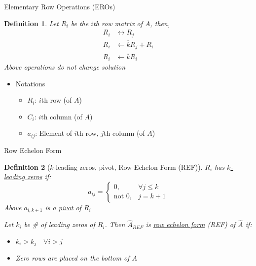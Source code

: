 \documentclass[a4paper,11pt]{article}
\newtheorem{defn}{Definition}
\begin{document}
\begin{frame}[t]{Elementary Row Operations (EROs)}
	\begin{defn}
		Let $R_i$ be the $i$th row matrix of $A$, then, 
		\begin{align*}
			R_i &\leftrightarrow R_j \tag{$ERO_1(i,j)$}\\
			R_i &\leftarrow \bar k R_j + R_i \tag{$ERO_2(k,j,i)$}\\
			R_i &\leftarrow \bar k R_i \tag{$ERO_3(k,i)$}
		\end{align*}
		Above operations do not change solution
	\end{defn}
	\begin{itemize}
		\item Notations
		\begin{itemize}
			\item $R_i$: $i$th row (of $A$)
			\item $C_i$: $i$th column (of $A$)
			\item $a_{ij}$: Element of $i$th row, $j$th column (of $A$)
		\end{itemize}
	\end{itemize}
\end{frame}
\begin{frame}[t]{Row Echelon Form}
	\begin{defn}
		[$k$-leading zeros, pivot, Row Echelon Form (REF)]
		$R_i$ has \uline{$k$-leading zeros} if:
		\[
			a_{ij}=\begin{cases}
				0,&\forall j\le k\\
				\text{not } 0,& j=k+1
			\end{cases}
		\]
		Above $a_{i,k+1}$ is a \uline{pivot} of $R_i$ 
		
		Let $k_i$ be \# of leading zeros of $R_i$. Then $\hat A_{REF}$ is \uline{row echelon form} (REF) of $\hat A$ if:
		\begin{itemize}
			\item $k_i > k_j \quad\forall i>j$
			\item Zero rows are placed on the bottom of $A$
		\end{itemize}
	\end{defn}
\end{frame}
\end{document}

